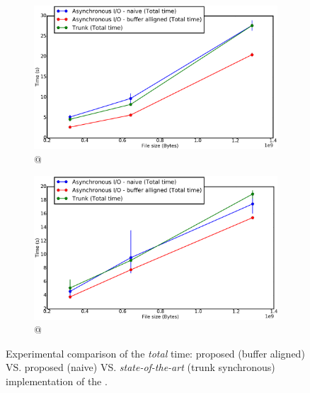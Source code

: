 			\begin{figure}[!h]
				\centering
				\begin{subfigure}[b]{0.475\textwidth}
					\centering
					\includegraphics[width=\textwidth]{charts/cubeRemapper_falseSharing_overall_time_workstation_8core.png}
					\caption[\targetPlatformLaptop \space @ \targetPlatformLaptopFrequency]
					{{\small \targetPlatformLaptop \space @ \targetPlatformLaptopFrequency}}
					\label{fig:cubeRemapper_falseSharing_overall_time_workstation_8core}
				\end{subfigure}
				\hfill
				\begin{subfigure}[b]{0.475\textwidth}  
					\centering
					\includegraphics[width=\textwidth]{charts/cubeRemapper_falseSharing_overall_time_hpc.png}
					\caption[]%
					{{\small \targetPlatformHpc \space @ \targetPlatformHpcFrequency}}
					\label{fig:cubeRemapper_falseSharing_overall_time_hpc}
				\end{subfigure}
				\caption{Experimental comparison of the \emph{total} time: proposed \emph{\notationaio}\space (buffer aligned) VS. proposed \emph{\notationaio}\space (naive) VS. \emph{state-of-the-art} (trunk synchronous) implementation of the \toolTargetSoftware.}
				\label{fig:cubeRemapper_falseSharing_overall_time}
			\end{figure}


